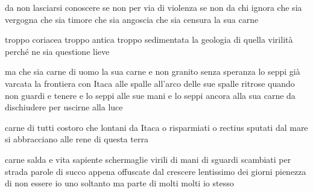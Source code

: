 \begin{poem}
	\begin{stanza}
		da non lasciarsi conoscere\verseline
		se non per via di violenza\verseline
		se non da chi ignora\verseline
		che sia vergogna\verseline
		che sia timore\verseline
		che sia angoscia\verseline
		che sia censura\verseline
		la sua carne
	\end{stanza}

	\begin{stanza}
		troppo coriacea\verseline
		troppo antica\verseline
		troppo sedimentata\verseline
		la geologia di quella virilità\verseline
		perché ne sia questione lieve
	\end{stanza}

	\begin{stanza}
		ma che sia\verseline
		carne di uomo la sua carne\verseline
		e non granito senza speranza\verseline
		lo seppi già varcata la frontiera\verseline
		con Itaca alle spalle\verseline
		all’arco delle sue spalle\verseline
		ritrose quando non guardi\verseline
		e tenere e lo seppi\verseline
		alle sue mani e lo seppi ancora\verseline
		alla sua carne da dischiudere\verseline
		per uscirne alla luce
	\end{stanza}
\end{poem}

\clearpage


\begin{poem}
	\begin{stanza}
		carne di tutti costoro\verseline
		che lontani da Itaca\verseline
		o risparmiati\verseline
		o rectius sputati dal mare\verseline
		si abbracciano alle rene\verseline
		di questa terra
	\end{stanza}

	\begin{stanza}
		carne salda e vita sapiente\verseline
		schermaglie virili di mani di sguardi\verseline
		scambiati per strada\verseline
		parole di succo appena offuscate\verseline
		dal crescere lentissimo dei giorni\verseline
		pienezza di non essere io uno soltanto\verseline
		ma parte di molti\verseline
		molti io stesso
	\end{stanza}
\end{poem}

\clearpage



